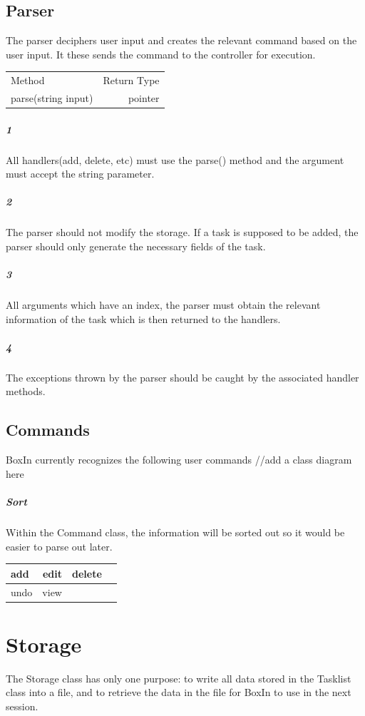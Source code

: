 \documentclass[12pt]{extarticle}
\begin{document}
\subsection{Parser}

The parser deciphers user input and creates the relevant command based on the user input. It these sends the command to the controller for execution.

\begin{center}
\begin{tabular}{|l|r|}
Method              & Return Type \\
parse(string input) & pointer    
\end{tabular}
\end{center}

\subparagraph{1} All handlers(add, delete, etc) must use the parse() method and the argument must accept the string parameter.

\subparagraph{2} The parser should not modify the storage. If a task is supposed to be added, the parser should only generate the necessary fields of the task.

\subparagraph{3} All arguments which have an index, the parser must obtain the relevant information of the task which is then returned to the handlers.

\subparagraph{4} The exceptions thrown by the parser should be caught by the associated handler methods.

\subsection{Commands}
BoxIn currently recognizes the following user commands
//add a class diagram here 
\subparagraph{Sort}
Within the Command class, the information will be sorted out so it would be easier to parse out later.

\begin{center}
\begin{tabular}{  lrrl}
\hline
add & edit & delete\\
\hline
undo & view\\
\hline     
\end{tabular}
\end{center}

\newpage

\section{Storage}
The Storage class has only one purpose: to write all data stored in the Tasklist class into a file, and to retrieve the data in the file for BoxIn to use in the next session. 
\end{document}
